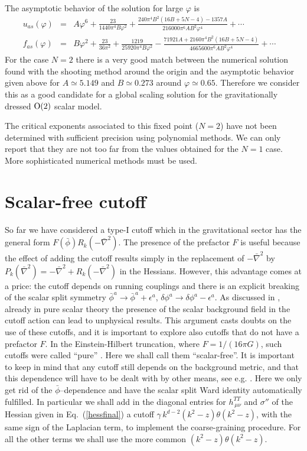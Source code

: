 \documentclass[a4paper,11pt]{revtex4}
\newcommand{\bea}{\begin{eqnarray}}
\newcommand{\eea}{\end{eqnarray}}
\newcommand{\bnabla}{\bar\nabla}
\begin{document}
The asymptotic behavior of the solution 
for large $\varphi$ is
\bea
u_{as}(\varphi)&=&
A \varphi ^6+\frac{23}{1440 \pi ^4 B \varphi ^2}+\frac{240 \pi ^4 B^2 (16 B+5 N-4)-1357 A}{216000 \pi ^6 A B^2 \varphi ^4}+\cdots\nonumber\\
f_{as}(\varphi)&=&
B \varphi ^2+\frac{23}{36 \pi ^2}+\frac{1219}{25920 \pi ^4 B \varphi ^2}
-\frac{71921 A+2160 \pi ^4 B^2 (16 B+5 N-4)}{4665600 \pi ^6 A B^2 \varphi ^4}+\cdots \quad
\eea
For the case $N=2$ %
there is a very good match between the numerical solution found with the shooting method around the origin
and the asymptotic behavior given above for $A\simeq 5.149$ and $B\simeq 0.273$ around $\varphi\simeq0.65$. 
Therefore we consider this as a good candidate for 
a global scaling solution for the gravitationally 
dressed ${\rm O(2)}$ scalar model.


The critical exponents associated to this fixed point ($N=2$) have not been determined with sufficient precision using polynomial methods. We can only report that they are not too far from the values obtained for the $N=1$ case.
More sophisticated numerical methods must be used.





\section{Scalar-free cutoff}

So far we have considered a type-I cutoff which in the gravitational
sector has the general form $F(\bar\phi)R_k(-\bnabla^2)$.
The presence of the prefactor $F$ is useful because the effect
of adding the cutoff results simply in the replacement of
$-\bnabla^2$ by $P_k(\bnabla^2)=-\bnabla^2+R_k(-\bnabla^2)$
in the Hessians.
However, this advantage comes at a price:
the cutoff depends on running couplings
and there is an explicit breaking of the scalar split symmetry
$\bar\phi^a\to\bar\phi^a+\epsilon^a$, 
$\delta\phi^a\to\delta\phi^a-\epsilon^a$.
As discussed in \cite{dietz3}, already in pure scalar theory
the presence of the scalar background field 
in the cutoff action can lead to unphysical results.
This argument casts doubts on the use of these cutoffs,
and it is important to explore also cutoffs that
do not have a prefactor $F$.
In the Einstein-Hilbert truncation, where $F=1/(16\pi G)$,
such cutoffs were called ``pure'' \cite{narain3}. 
Here we shall call them ``scalar-free''. 
It is important to keep in mind that any cutoff still
depends on the background metric, and that this dependence will
have to be dealt with by other means, see e.g. \cite{dietz4,becker}.
Here we only get rid of the $\bar\phi$--dependence and have the scalar split Ward identity automatically fulfilled.
In particular we shall add in the diagonal entries for $h^{TT}_{\,\mu\nu}$ and $\sigma''$ of the Hessian given in Eq.~(\ref{hessfinal})  a cutoff $\gamma\, k^{d-2}(k^2-z)\theta(k^2-z)$, 
with the same sign of the Laplacian term, to implement the coarse-graining procedure. For all the other terms we shall use the more common
$(k^2-z)\theta(k^2-z)$.
\end{document}
